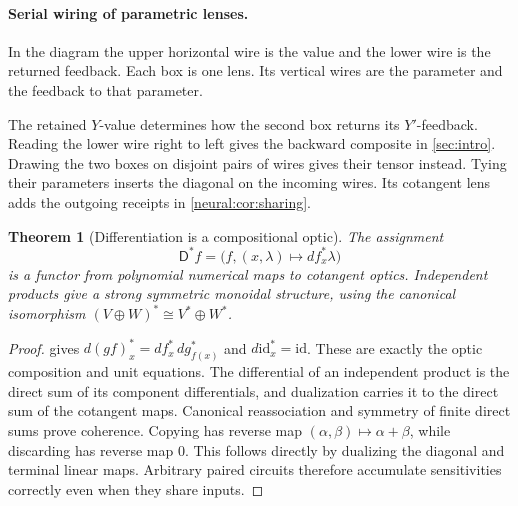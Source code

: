 \documentclass[11pt,a4paper]{article}
\newtheorem{theorem}{Theorem}[section]
\theoremstyle{definition}
\theoremstyle{remark}\newaliascnt{remark}{theorem}
\newcommand{\id}{\mathrm{id}}
\numberwithin{equation}{section}
\begin{document}
\paragraph{Serial wiring of parametric lenses.}
In the diagram the upper horizontal wire is the value and the lower wire is the returned feedback. Each box is one lens. Its vertical wires are the parameter and the feedback to that parameter.
\begin{center}
\end{center}
The retained \(Y\)-value determines how the second box returns its \(Y'\)-feedback. Reading the lower wire right to left gives the backward composite in \cref{sec:intro}. Drawing the two boxes on disjoint pairs of wires gives their tensor instead. Tying their parameters inserts the diagonal on the incoming wires. Its cotangent lens adds the outgoing receipts in \cref{neural:cor:sharing}.
\begin{theorem}[Differentiation is a compositional optic]\label{neural:thm:cotangent}
The assignment
\[
 \mathsf D^*f=\bigl(f,(x,\lambda)\mapsto df_x^*\lambda\bigr)
\]
is a functor from polynomial numerical maps to cotangent optics. Independent products give a strong symmetric monoidal structure, using the canonical isomorphism $(V\oplus W)^*\cong V^*\oplus W^*$.
\end{theorem}
\begin{proof}
 gives
$d(gf)_x^*=df_x^*\,dg_{f(x)}^*$ and $d\id_x^*=\id$. These are exactly the optic composition and unit equations. The differential of an independent product is the direct sum of its component differentials, and dualization carries it to the direct sum of the cotangent maps. Canonical reassociation and symmetry of finite direct sums prove coherence. Copying has reverse map $(\alpha,\beta)\mapsto\alpha+\beta$, while discarding has reverse map $0$. This follows directly by dualizing the diagonal and terminal linear maps. Arbitrary paired circuits therefore accumulate sensitivities correctly even when they share inputs.
\end{proof}
\end{document}
